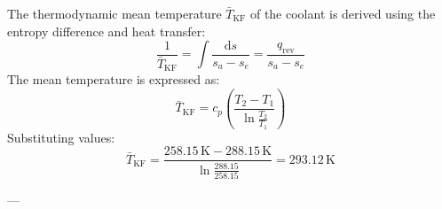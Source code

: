 The thermodynamic mean temperature \( \bar{T}_{\text{KF}} \) of the coolant is derived using the entropy difference and heat transfer:  
\[
\frac{1}{\bar{T}_{\text{KF}}} = \int \frac{\text{d}s}{s_a - s_e} = \frac{q_{\text{rev}}}{s_a - s_e}
\]  
The mean temperature is expressed as:  
\[
\bar{T}_{\text{KF}} = c_p \left( \frac{T_2 - T_1}{\ln \frac{T_2}{T_1}} \right)
\]  
Substituting values:  
\[
\bar{T}_{\text{KF}} = \frac{258.15 \, \text{K} - 288.15 \, \text{K}}{\ln \frac{288.15}{258.15}} = 293.12 \, \text{K}
\]  

---